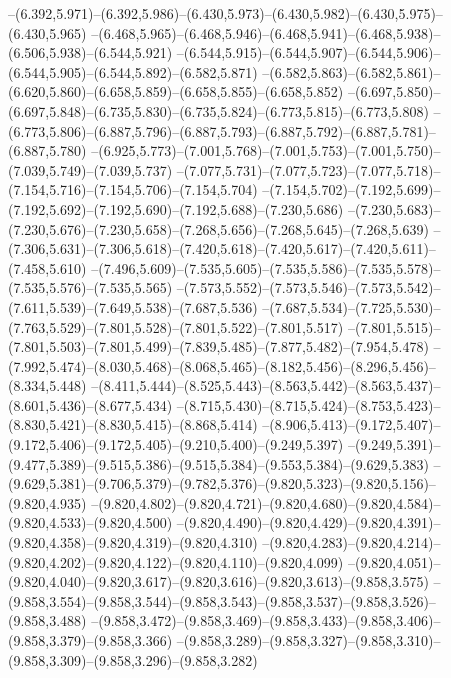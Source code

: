   --(6.392,5.971)--(6.392,5.986)--(6.430,5.973)--(6.430,5.982)--(6.430,5.975)--(6.430,5.965)%
  --(6.468,5.965)--(6.468,5.946)--(6.468,5.941)--(6.468,5.938)--(6.506,5.938)--(6.544,5.921)%
  --(6.544,5.915)--(6.544,5.907)--(6.544,5.906)--(6.544,5.905)--(6.544,5.892)--(6.582,5.871)%
  --(6.582,5.863)--(6.582,5.861)--(6.620,5.860)--(6.658,5.859)--(6.658,5.855)--(6.658,5.852)%
  --(6.697,5.850)--(6.697,5.848)--(6.735,5.830)--(6.735,5.824)--(6.773,5.815)--(6.773,5.808)%
  --(6.773,5.806)--(6.887,5.796)--(6.887,5.793)--(6.887,5.792)--(6.887,5.781)--(6.887,5.780)%
  --(6.925,5.773)--(7.001,5.768)--(7.001,5.753)--(7.001,5.750)--(7.039,5.749)--(7.039,5.737)%
  --(7.077,5.731)--(7.077,5.723)--(7.077,5.718)--(7.154,5.716)--(7.154,5.706)--(7.154,5.704)%
  --(7.154,5.702)--(7.192,5.699)--(7.192,5.692)--(7.192,5.690)--(7.192,5.688)--(7.230,5.686)%
  --(7.230,5.683)--(7.230,5.676)--(7.230,5.658)--(7.268,5.656)--(7.268,5.645)--(7.268,5.639)%
  --(7.306,5.631)--(7.306,5.618)--(7.420,5.618)--(7.420,5.617)--(7.420,5.611)--(7.458,5.610)%
  --(7.496,5.609)--(7.535,5.605)--(7.535,5.586)--(7.535,5.578)--(7.535,5.576)--(7.535,5.565)%
  --(7.573,5.552)--(7.573,5.546)--(7.573,5.542)--(7.611,5.539)--(7.649,5.538)--(7.687,5.536)%
  --(7.687,5.534)--(7.725,5.530)--(7.763,5.529)--(7.801,5.528)--(7.801,5.522)--(7.801,5.517)%
  --(7.801,5.515)--(7.801,5.503)--(7.801,5.499)--(7.839,5.485)--(7.877,5.482)--(7.954,5.478)%
  --(7.992,5.474)--(8.030,5.468)--(8.068,5.465)--(8.182,5.456)--(8.296,5.456)--(8.334,5.448)%
  --(8.411,5.444)--(8.525,5.443)--(8.563,5.442)--(8.563,5.437)--(8.601,5.436)--(8.677,5.434)%
  --(8.715,5.430)--(8.715,5.424)--(8.753,5.423)--(8.830,5.421)--(8.830,5.415)--(8.868,5.414)%
  --(8.906,5.413)--(9.172,5.407)--(9.172,5.406)--(9.172,5.405)--(9.210,5.400)--(9.249,5.397)%
  --(9.249,5.391)--(9.477,5.389)--(9.515,5.386)--(9.515,5.384)--(9.553,5.384)--(9.629,5.383)%
  --(9.629,5.381)--(9.706,5.379)--(9.782,5.376)--(9.820,5.323)--(9.820,5.156)--(9.820,4.935)%
  --(9.820,4.802)--(9.820,4.721)--(9.820,4.680)--(9.820,4.584)--(9.820,4.533)--(9.820,4.500)%
  --(9.820,4.490)--(9.820,4.429)--(9.820,4.391)--(9.820,4.358)--(9.820,4.319)--(9.820,4.310)%
  --(9.820,4.283)--(9.820,4.214)--(9.820,4.202)--(9.820,4.122)--(9.820,4.110)--(9.820,4.099)%
  --(9.820,4.051)--(9.820,4.040)--(9.820,3.617)--(9.820,3.616)--(9.820,3.613)--(9.858,3.575)%
  --(9.858,3.554)--(9.858,3.544)--(9.858,3.543)--(9.858,3.537)--(9.858,3.526)--(9.858,3.488)%
  --(9.858,3.472)--(9.858,3.469)--(9.858,3.433)--(9.858,3.406)--(9.858,3.379)--(9.858,3.366)%
  --(9.858,3.289)--(9.858,3.327)--(9.858,3.310)--(9.858,3.309)--(9.858,3.296)--(9.858,3.282)%
